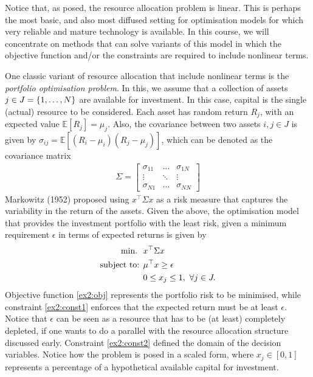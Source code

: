 \documentclass{article}
\begin{document}
Notice that, as posed, the resource allocation problem is linear. This is perhaps the most basic, and also most diffused setting for optimisation models for which very reliable and mature technology is available. In this course, we will concentrate on methods that can solve variants of this model in which the objective function and/or the constraints are required to include nonlinear terms. 

One classic variant of resource allocation that include nonlinear terms is the \emph{portfolio optimisation problem}. In this, we assume that a collection of assets $j \in J = \left\{ 1,\dots, N \right \}$ are available for investment. In this case, capital is the single (actual) resource to be considered. Each asset has random return $R_j$, with an expected value $\mathbb{E}[R_j] = \mu_j$. Also, the covariance between two assets $i,j \in J$ is given by $\sigma_{ij} = \mathbb{E}[(R_i - \mu_i)(R_j - \mu_j)]$, which can be denoted as the covariance matrix 
%
\begin{align*}
\Sigma = \begin{bmatrix}
 \sigma_{11} & \dots & \sigma_{1N} \\ 
 \vdots      & \ddots & \vdots \\
 \sigma_{N1}  & \dots & \sigma_{NN}
\end{bmatrix}
\end{align*}
%
Markowitz (1952) proposed using $x^\top\Sigma x$ as a risk measure that captures the variability in the return of the assets. Given the above, the optimisation model that provides the investment portfolio with the least risk, given a minimum requirement $\epsilon$ in terms of expected returns is given by
%
\begin{align}
\mathop{\text{min.} \ } \ &  x^\top\Sigma x \label{ex2:obj} \\
\mbox{subject to: } & \mu^\top x  \geq \epsilon \label{ex2:const1}\\
& 0 \leq x_j \leq 1, \ \forall j \in J. \label{ex2:const2}
\end{align} 
%
Objective function \eqref{ex2:obj} represents the portfolio risk to be minimised, while constraint \eqref{ex2:const1} enforces that the expected return must be at least $\epsilon$. Notice that $\epsilon$ can be seen as a resource that has to be (at least) completely depleted, if one wants to do a parallel with the resource allocation structure discussed early. Constraint \eqref{ex2:const2} defined the domain of the decision variables. Notice how the problem is posed in a scaled form, where $x_j \in [0,1]$ represents a percentage of a hypothetical available capital for investment.
\end{document}
